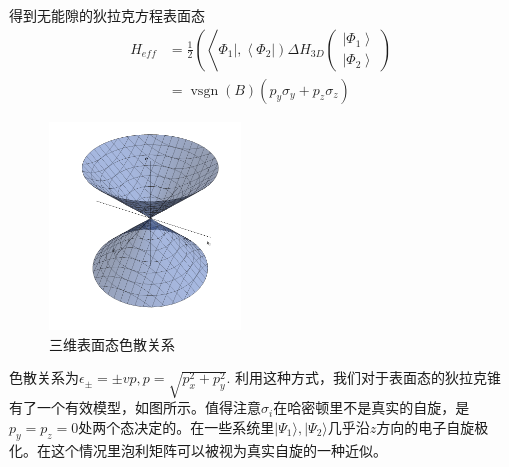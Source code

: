 \documentclass{article}
\numberwithin{equation}{subsection}
\begin{document}
得到无能隙的狄拉克方程表面态
\begin{equation}
    \begin{aligned}
H_{e f f} &=\frac{1}{2}\left(\left\langle\Phi_{1}\left|,\left\langle\Phi_{2}\right|\right) \Delta H_{3 D}\left(\begin{array}{c}
\left|\Phi_{1}\right\rangle \\
\left|\Phi_{2}\right\rangle
\end{array}\right)\right.\right.\\
&=\operatorname{vsgn}(B)\left(p_{y} \sigma_{y}+p_{z} \sigma_{z}\right)
\end{aligned}
\end{equation}
\begin{figure}[h]
    \centering
    \includegraphics[width=2in]{dirac5.pdf}
    \caption{\footnotesize{三维表面态色散关系}}\label{dirac pic 5}
\end{figure}

色散关系为$\epsilon_\pm=\pm vp,p=\sqrt{p_x^2+p_y^2}$. 利用这种方式，我们对于表面态的狄拉克锥有了一个有效模型，如图所示。值得注意$\sigma_i$在哈密顿里不是真实的自旋，是$p_y=p_z=0$处两个态决定的。在一些系统里$|\Psi_1\rangle,|\Psi_2\rangle$几乎沿$z$方向的电子自旋极化。在这个情况里泡利矩阵可以被视为真实自旋的一种近似。
\end{document}
